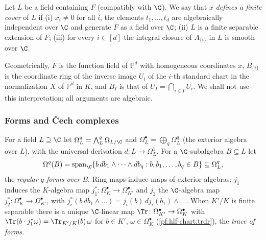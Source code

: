 \begin{definition}\label{pf:hlf-chart:def:fincover}
Let $L$ be a field containing $F$ (compatibly with $\C$). We say that $x$ \emph{defines a finite cover} of $L$ if
(i) $x_i\ne0$ for all $i$, the elements $t_1,\dots,t_d$ are algebraically independent over $\C$ and generate $F$ as a field over $\C$;
(ii) $L$ is a finite separable extension of $F$; (iii) for every $i\in[d]$ the integral closure of $A_{\{i\}}$ in $L$ is smooth over $\C$.
\end{definition}

Geometrically, $F$ is the function field of $\mathbb P^d$ with homogeneous coordinates $x$, $B_{\{i\}}$ is the coordinate ring of the inverse
image $U_i$ of the $i$-th standard chart in the normalization $X$ of $\mathbb P^d$ in $K$, and $B_I$ is that of $U_I=\bigcap_{i\in I}U_i$. We
shall not use this interpretation; all arguments are algebraic.

\subsubsection*{Forms and \v{C}ech complexes}
For a field $L\supseteq\C$ let $\Omega^q_L=\bigwedge^q_L\Omega_{L/\C}$ and $\Omega^\bullet_L=\bigoplus_q\Omega^q_L$ (the exterior algebra
over $L$), with the universal derivation $d\colon L\to\Omega^1_L$. For a $\C$-subalgebra $B\subseteq L$ let
\[
  \Omega^q(B)=\operatorname{span}_\C\{b\,db_1\wedge\dots\wedge db_q : b,b_1,\dots,b_q\in B\}\subseteq\Omega^q_L,
\]
the \emph{regular $q$-forms over $B$}. Ring maps induce maps of exterior algebras: $j_1$ induces the $K$-algebra map
$j_1^*\colon\Omega^\bullet_K\to\Omega^\bullet_{K'}$ and $j_2$ the $\C$-algebra map $j_2^*\colon\Omega^\bullet_K\to\Omega^\bullet_{K'}$, with
$j_i^*(b\,db_1\wedge\dots)=j_i(b)\,dj_i(b_1)\wedge\dots$. When $K'/K$ is finite separable there is a unique $\C$-linear map
$\Tr\colon\Omega^\bullet_{K'}\to\Omega^\bullet_K$ with $\Tr(b\cdot j_1^*\omega)=\Tr_{K'/K}(b)\,\omega$ for $b\in K'$, $\omega\in\Omega^\bullet_K$
(\cref{pf:hlf-chart:trdr}), the \emph{trace of forms}.

